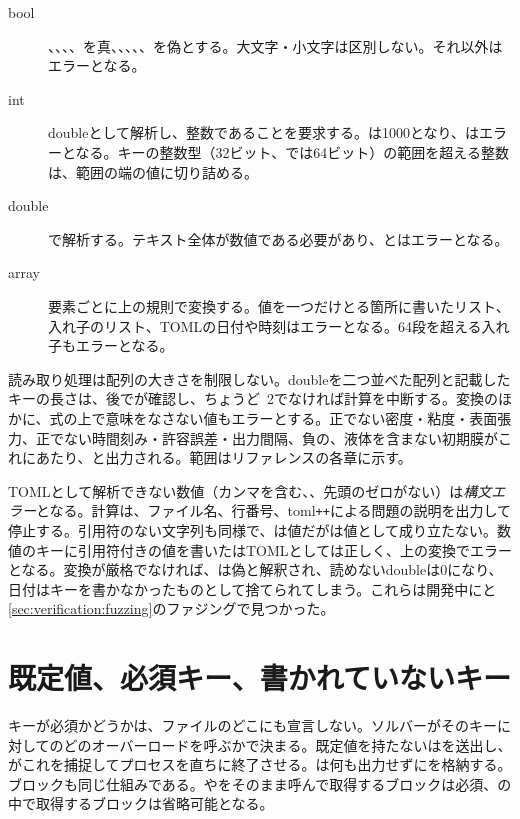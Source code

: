 \begin{description}
  \item[bool] 、、、、を真、、、、、を偽とする。大文字・小文字は区別しない。それ以外はエラーとなる。
  \item[int] doubleとして解析し、整数であることを要求する。は1000となり、はエラーとなる。キーの整数型（32ビット、では64ビット）の範囲を超える整数は、範囲の端の値に切り詰める。
  \item[double] で解析する。テキスト全体が数値である必要があり、とはエラーとなる。
  \item[array] 要素ごとに上の規則で変換する。値を一つだけとる箇所に書いたリスト、入れ子のリスト、TOMLの日付や時刻はエラーとなる。64段を超える入れ子もエラーとなる。
\end{description}

読み取り処理は配列の大きさを制限しない。doubleを二つ並べた配列と記載したキーの長さは、後でが確認し、ちょうど~2でなければ計算を中断する。変換のほかに、式の上で意味をなさない値もエラーとする。正でない密度・粘度・表面張力、正でない時間刻み・許容誤差・出力間隔、負の、液体を含まない初期膜がこれにあたり、と出力される。範囲はリファレンスの各章に示す。

\begin{note}[TOMLが検出する誤り]
  TOMLとして解析できない数値（カンマを含む、、先頭のゼロがない）は\emph{構文エラー}となる。計算は、ファイル名、行番号、toml\texttt{++}による問題の説明を出力して停止する。引用符のない文字列も同様で、は値だがは値として成り立たない。数値のキーに引用符付きの値を書いたはTOMLとしては正しく、上の変換でエラーとなる。変換が厳格でなければ、は偽と解釈され、読めないdoubleは0になり、日付はキーを書かなかったものとして捨てられてしまう。これらは開発中にと\cref{sec:verification:fuzzing}のファジングで見つかった。
\end{note}

\section{既定値、必須キー、書かれていないキー}
\label{sec:inputformat:defaults}

キーが必須かどうかは、ファイルのどこにも宣言しない。ソルバーがそのキーに対してのどのオーバーロードを呼ぶかで決まる。既定値を持たないはを送出し、がこれを捕捉してプロセスを直ちに終了させる。は何も出力せずにを格納する。ブロックも同じ仕組みである。やをそのまま呼んで取得するブロックは必須、の中で取得するブロックは省略可能となる。

